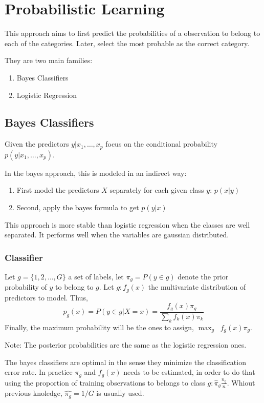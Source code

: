 \section{Probabilistic Learning}
This approach aims to first predict the probabilities of a observation to belong
to each of the categories. Later, select the most probable as the correct category.

They are two main families:
\begin{enumerate}
    \item Bayes Classifiers
    \item Logistic Regression
\end{enumerate}

\subsection{Bayes Classifiers}
Given the predictors $y | x_1,\dots,x_p$ focus on the conditional probability
$p(y | x_1,\dots,x_p)$.

In the bayes approach,  this is modeled in an indirect way:
\begin{enumerate}
    \item First model the predictors $X$ separately for each given class $y$: $p(x|y)$
    \item Second, apply the bayes formula to get $p(y|x)$ 
\end{enumerate}

This approach is more stable than logistic regression when the classes are well
separated. It performs well when the variables are gaussian distributed.

\subsubsection{Classifier}
Let $g=\{1,2,\dots,G\}$ a set of labels, let $\pi_g =P(y \in g)$ denote the
prior probability of $y$ to belong to $g$. Let $g : f_g(x)$ the
multivariate distribution of predictors to model. Thus,
\begin{equation}
    p_g(x) = P(y \in g | X = x) = \frac{f_g(x)\pi_g}{\sum_k f_k(x)\pi_k}
\end{equation}
Finally, the maximum probability will be the ones to assign, $\max_g\;\; f_g(x)\pi_g$. 
\begin{tcolorbox}
    Note: The posterior probabilities are the same as the logistic regression ones. 
\end{tcolorbox}
The bayes classifiers are optimal in the sense they minimize the classification
error rate. In practice $\pi_g$ and $f_g(x)$ needs to be estimated, in order to do that using
the proportion of training observations to belongs to class $g: \hat{\pi}_g
\frac{n_g}{n}$. Whiout previous knoledge, $\hat{\pi_g} = 1/G$ is usually used.


